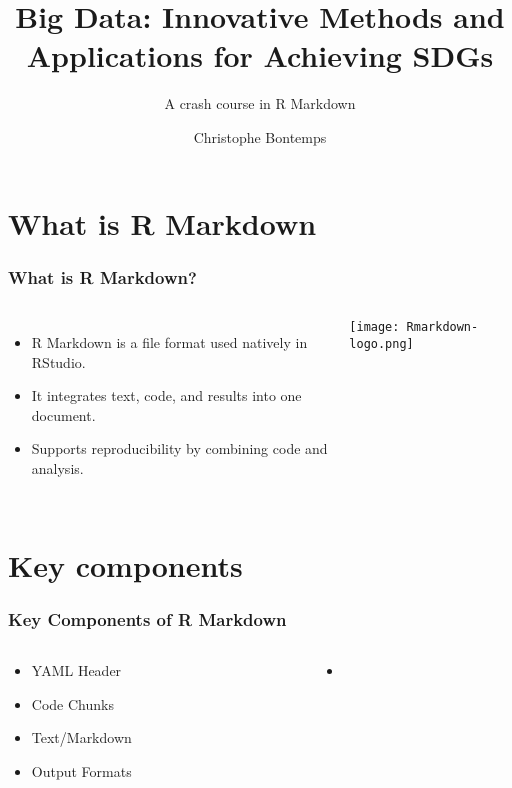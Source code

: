 \documentclass[xcolor=x11names,compress]{beamer}
\title{\textcolor{siap}{Big Data: Innovative Methods and Applications for Achieving SDGs \\ \vspace{0.5cm} }}
\subtitle{\textcolor{brique}{\Large{A crash course in R Markdown}}}
\author{Christophe Bontemps}
\institute{ \texttt{[image: SIAP\_logo\_Big.png]}}
\date{}
\renewcommand{\(}{\begin{columns}}
\renewcommand{\)}{\end{columns}}
\newcommand{\<}[1]{\begin{column}{#1}}
\renewcommand{\>}{\end{column}}
\begin{document}
\begin{frame}
    \titlepage
\end{frame}

\section{What is R Markdown}

\begin{frame}
    \frametitle{What is R Markdown?}
    \begin{columns}
            \begin{itemize}[<+->]
                \item R Markdown is a file format used natively in RStudio.
                \item It integrates text, code, and results into one document.
                \item Supports reproducibility by combining code and analysis.
            \end{itemize}
            \texttt{[image: Rmarkdown-logo.png]} %
    \end{columns}
\end{frame}

\section{Key components}
\begin{frame}
    \frametitle{Key Components of R Markdown}
    \begin{columns}
         \begin{column}{0.35\textwidth}
            \begin{itemize}[<+->]
                \item YAML Header
                \item Code Chunks
                \item Text/Markdown
                \item Output Formats
            \end{itemize}
        \end{column}
        \begin{column}{0.65\textwidth}
            \begin{itemize}
            \item[]
            \end{itemize}
         \end{column}
    \end{columns}
\end{frame}
\end{document}
